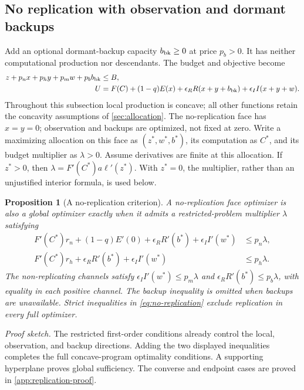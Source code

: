 \documentclass[11pt,a4paper]{article}
\newtheorem{proposition}{Proposition}
\theoremstyle{definition}\newtheorem{definition}{Definition}
\begin{document}
\subsection{No replication with observation and dormant backups}
Add an optional dormant-backup capacity $b_{\rm bk}\geq0$ at price $p_b>0$.
It has neither computational production nor descendants. The budget and
objective become
\begin{align}
 z+p_nx+p_hy+p_mw+p_bb_{\rm bk}&\leq B,\nonumber\\
 U&=F(C)+(1-q)E(x)+\epsilon_RR(x+y+b_{\rm bk})
                  +\epsilon_II(x+y+w).
 \label{eq:backup-model}
\end{align}
Throughout this subsection local production is concave; all other functions retain the concavity assumptions of \cref{sec:allocation}.
The no-replication face has $x=y=0$; observation and backups are optimized,
not fixed at zero. Write a maximizing allocation on this face as
$(z^*,w^*,b^*)$, its computation as $C^*$, and its budget multiplier as
$\lambda>0$. Assume derivatives are finite at this allocation. If $z^*>0$,
then $\lambda=F'(C^*)a\ell'(z^*)$. With $z^*=0$, the multiplier, rather
than an unjustified interior formula, is used below.

\begin{proposition}[A no-replication criterion]
\label{prop:no-replication}
A no-replication face optimizer is also a global optimizer exactly when
it admits a restricted-problem multiplier $\lambda$ satisfying
\begin{align}
 F'(C^*)r_n+(1-q)E'(0)+\epsilon_RR'(b^*)+\epsilon_II'(w^*)
     &\leq p_n\lambda,\nonumber\\
 F'(C^*)r_h+\epsilon_RR'(b^*)+\epsilon_II'(w^*)
     &\leq p_h\lambda.
 \label{eq:no-replication}
\end{align}
The non-replicating channels satisfy
$\epsilon_II'(w^*)\leq p_m\lambda$ and
$\epsilon_RR'(b^*)\leq p_b\lambda$, with equality in each positive
channel. The backup inequality is omitted when backups are unavailable.
Strict inequalities in \cref{eq:no-replication} exclude replication in
every full optimizer.
\end{proposition}
\noindent\emph{Proof sketch.}
The restricted first-order conditions already control the local,
observation, and backup directions. Adding the two displayed inequalities
completes the full concave-program optimality conditions. A supporting
hyperplane proves global sufficiency. The converse and endpoint cases
are proved in \cref{app:replication-proof}.
\end{document}
